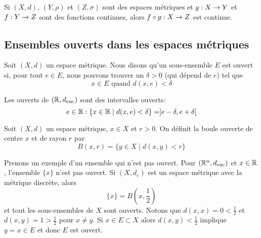 \documentclass[french]{article}
\begin{document}
\begin{lemme}
  Si $(X, d)$, $(Y, \rho)$ et $(Z, \sigma)$ sont des espaces métriques et $g: X \rightarrow Y$ et $f: Y \rightarrow Z$ sont des fonctions continues, alors $f \circ g: X \rightarrow Z$ est continue.
\end{lemme}

\subsection{Ensembles ouverts dans les espaces métriques}
\begin{definition}
  Soit $(X, d)$ un espace métrique. Nous disons qu'un sous-ensemble $E$ est ouvert si, pour tout $e \in E$, nous pouvons trouver un $\delta > 0$ (qui dépend de $e$) tel que
  $$x \in E \text{ quand } d(x, e) < \delta$$
\end{definition}
Les ouverts de $(\mathbb{R}, d_\text{euc})$ sont des intervalles ouverts:
$$e \in \mathbb{R} : \{ x \in \mathbb{R} \mid d(x, e) < \delta \} = ]e -\delta, e + \delta[$$

\begin{definition}
  Soit $(X, d)$ un espace métrique, $x \in X$ et $r > 0$. On définit la boule ouverte de centre $x$ et de rayon $r$ par
  $$B(x, r) = \{ y \in X \mid d(x, y) < r \}$$
\end{definition}
Prenons un exemple d'un ensemble qui n'est pas ouvert. Pour $(\mathbb{R}^n, d_\text{euc})$ et $x \in \mathbb{R}$, l'ensemble $\{ x \}$ n'est pas ouvert.
\newline Si $(X, d_\varepsilon)$ est un espace métrique avec la métrique discrète, alors
$$\{ x \} = B\left(x, \frac{1}{2}\right)$$
et tout les sous-ensembles de $X$ sont ouverts. Notons que $d(x, x) = 0 < \frac{1}{2}$ et $d(x, y) = 1 > \frac{1}{2}$ pour $x \neq y$. Si $x \in E \subset X$ alors $d(x, y) < \frac{1}{2}$ implique $y = x \in E$ et donc $E$ est ouvert.
\end{document}
